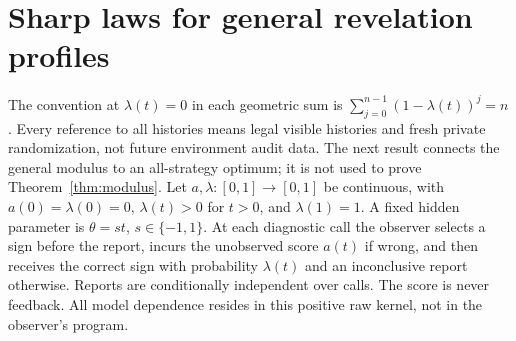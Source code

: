\section{Sharp laws for general revelation profiles}\label{sec:profiles}
The convention at $\lambda(t)=0$ in each geometric sum is $\sum_{j=0}^{n-1}(1-\lambda(t))^j=n$. Every reference to all histories means legal visible histories and fresh private randomization, not future environment audit data.
The next result connects the general modulus to an all-strategy optimum; it is not used to prove Theorem~\ref{thm:modulus}. Let $a,\lambda:[0,1]\to[0,1]$ be continuous, with $a(0)=\lambda(0)=0$, $\lambda(t)>0$ for $t>0$, and $\lambda(1)=1$. A fixed hidden parameter is $\theta=st$, $s\in\{-1,1\}$. At each diagnostic call the observer selects a sign before the report, incurs the unobserved score $a(t)$ if wrong, and then receives the correct sign with probability $\lambda(t)$ and an inconclusive report otherwise. Reports are conditionally independent over calls. The score is never feedback. All model dependence resides in this positive raw kernel, not in the observer's program.

